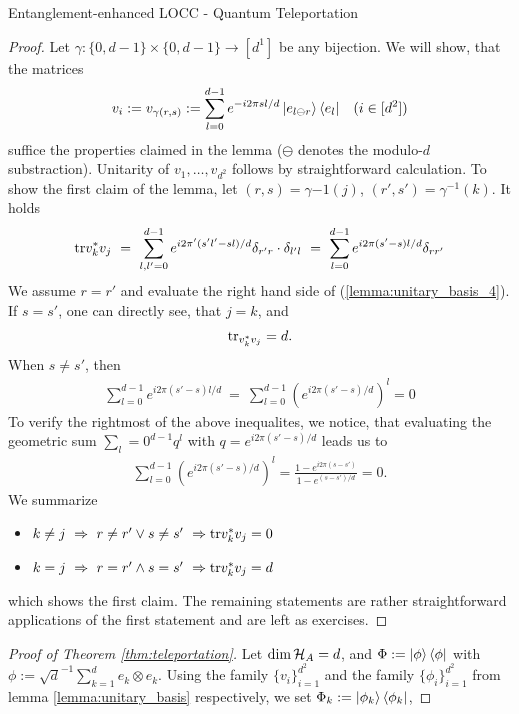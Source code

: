 \begin{subsection}{Entanglement-enhanced LOCC - Quantum Teleportation}
\begin{proof}
Let $\gamma: \{0,d-1\} \times \{0,d-1\} \rightarrow [d^1]$ be any bijection. We will show, that the matrices
\begin{align}
v_i := v_{\gamma(r,s)} := \sum_{l=0}^{d-1} e^{-i2\pi s l /d} \ket{e_{l \ominus r}}\bra{e_l} &&(i \in [d^2]) 
\end{align}
suffice the properties claimed in the lemma ($\ominus$ denotes the modulo-$d$ substraction). Unitarity of $v_1,\dots, v_{d^2}$ follows by straightforward calculation. To show the first claim of the lemma, 
let $(r,s) = \gamma{-1}(j)$, $(r',s') = \gamma^{-1}(k)$. It holds
\begin{align}
\tr v_k^\ast v_j \ 
= \ \sum_{l,l'=0}^{d-1} e^{i2\pi'(s'l' - sl)/d} \delta_{r'r}\cdot \delta_{l'l} \
= \ \sum_{l=0}^{d-1} e^{i2\pi(s'-s)l/d}  \delta_{rr'} \label{lemma:unitary_basis_4}
\end{align}
We assume $r = r'$ and evaluate the right hand side of (\ref{lemma:unitary_basis_4}). If $s=s'$, one can directly see, that $j=k$, and 
\begin{align}
\mathrm{tr}_{v_k^\ast v_j} = d.
\end{align}
When $s \neq s'$, then 
\begin{align}
\sum_{l=0}^{d-1} e^{i2\pi(s'-s)l/d} \ = \ \sum_{l=0}^{d-1} (e^{i2\pi(s'-s)/d})^l = 0
\end{align}
To verify the rightmost of the above inequalites, we notice, that evaluating the geometric sum $\sum_l=0^{d-1} q^l$ with $q = e^{i2\pi(s'-s)/d}$ leads us to 
\begin{align}
\sum_{l=0}^{d-1} (e^{i2\pi(s'-s)/d})^l = \frac{1 - e^{i2\pi(s-s')}}{1- e^{(s-s')/d}} = 0.
\end{align}
We summarize
\begin{itemize}
\item $k \neq j \ \Rightarrow \ r \neq r' \vee s \neq s' \ \Rightarrow \mathrm{tr} v_k^\ast v_j = 0$
\item $k = j \ \Rightarrow \ r = r' \wedge s=s' \ \Rightarrow \mathrm{tr} v_k^\ast v_j = d$
\end{itemize}
which shows the first claim. The remaining statements are rather straightforward applications of the first statement and are left as exercises. 
\end{proof}
\begin{proof}[Proof of Theorem \ref{thm:teleportation}]
Let $\dim {\mathcal H}_A = d$, and $\Phi := \ket{\phi}\bra{\phi}$ with $\phi := \sqrt{d}^{-1} \sum_{k=1}^d e_k \otimes e_k$. Using the family $\{v_i\}_{i=1}^{d^2}$ and the family $\{\phi_i\}_{i=1}^{d^2}$ from lemma \ref{lemma:unitary_basis} respectively, we set $\Phi_k := \ket{\phi_k}\bra{\phi_k}$,

\end{proof}
\end{subsection}
